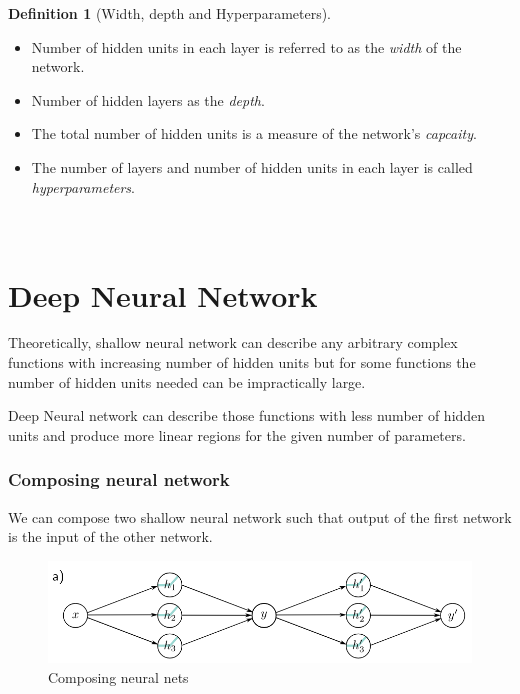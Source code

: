 \documentclass[12pt,reqno]{amsart}
\theoremstyle{plain}
\theoremstyle{definition}
\newtheorem{defn}{Definition}
\begin{document}
\begin{defn}[Width, depth and Hyperparameters]
    \noindent
    \begin{itemize}
        \item Number of hidden units in each layer is referred to as the {\it width} of the network.
        \item Number of hidden layers as the {\it depth}.
        \item The total number of hidden units is a measure of the network's {\it capcaity}.
        \item The number of layers and number of hidden units in each layer is called {\it hyperparameters}.
    \end{itemize}
\end{defn}

{\large \part{\centering \\ Deep Neural Network}} %

Theoretically, shallow neural network can describe any arbitrary complex functions with increasing number of hidden units but for some functions the number of hidden units needed can be impractically large. 

Deep Neural network can describe those functions with less number of hidden units and produce more linear regions for the given number of parameters.

\section{Composing neural network}
We can compose two shallow neural network such that output of the first network is the input of the other network.
\begin{figure}[!ht]
    \centering
    \includegraphics[scale=.42]{../assets/dl/compose.png}
    \caption{Composing neural nets}
\end{figure}
\end{document}
